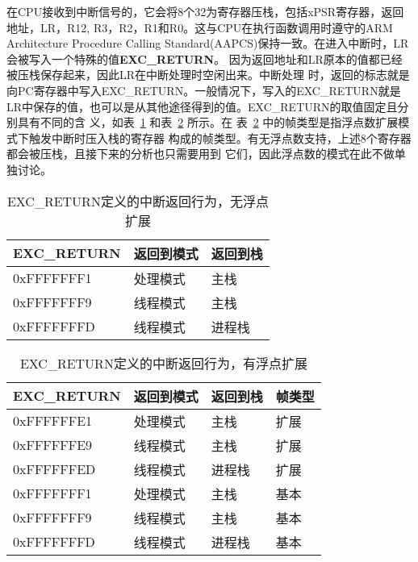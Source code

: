 在CPU接收到中断信号的，它会将8个32为寄存器压栈，包括xPSR寄存器，返回地址，LR，R12,
R3，R2，R1和R0。这与CPU在执行函数调用时遵守的ARM Architecture Procedure Calling
Standard(AAPCS)保持一致。在进入中断时，LR会被写入一个特殊的值\textbf{EXC\_RETURN}。
因为返回地址和LR原本的值都已经被压栈保存起来，因此LR在中断处理时空闲出来。中断处理
时，返回的标志就是向PC寄存器中写入EXC\_RETURN。一般情况下，写入的EXC\_RETURN就是
LR中保存的值，也可以是从其他途径得到的值。EXC\_RETURN的取值固定且分别具有不同的含
义，如表~\ref{tab:exe_return_noFP} 和表~\ref{tab:exe_return_FP} 所示。在
表~\ref{tab:exe_return_FP} 中的帧类型是指浮点数扩展模式下触发中断时压入栈的寄存器
构成的帧类型。有无浮点数支持，上述8个寄存器都会被压栈，且接下来的分析也只需要用到
它们，因此浮点数的模式在此不做单独讨论。\cite{ARM} 

\begin{table}[htb]
	\centering
	\caption{EXC\_RETURN定义的中断返回行为，无浮点扩展}
	\label{tab:exe_return_noFP}
	\begin{tabularx}{\linewidth}{XXX}
		\toprule[1.5pt]
		{\heiti EXC\_RETURN} & {\heiti 返回到模式} & {\heiti 返回到栈}\\
		\midrule[1pt]
		0xFFFFFFF1 & 处理模式 & 主栈 \\
		\midrule[0.5pt]
		0xFFFFFFF9 & 线程模式 & 主栈 \\
		\midrule[0.5pt]
		0xFFFFFFFD & 线程模式 & 进程栈 \\
		\bottomrule[1.5pt]
	\end{tabularx}
\end{table}

\begin{table}[htb]
	\centering
	\caption{EXC\_RETURN定义的中断返回行为，有浮点扩展}
	\label{tab:exe_return_FP}
	\begin{tabularx}{\linewidth}{XXXX}
		\toprule[1.5pt]
		{\heiti EXC\_RETURN} & {\heiti 返回到模式} & {\heiti 返回到栈} &
		{\heiti 帧类型}\\
		\midrule[1pt]
		0xFFFFFFE1 & 处理模式 & 主栈 & 扩展\\
		\midrule[0.5pt]
		0xFFFFFFE9 & 线程模式 & 主栈 & 扩展\\
		\midrule[0.5pt]
		0xFFFFFFED & 线程模式 & 进程栈 & 扩展\\
		\midrule[0.5pt]
		0xFFFFFFF1 & 处理模式 & 主栈 & 基本\\
		\midrule[0.5pt]
		0xFFFFFFF9 & 线程模式 & 主栈 & 基本\\
		\midrule[0.5pt]
		0xFFFFFFFD & 线程模式 & 进程栈 & 基本\\
		\bottomrule[1.5pt]
	\end{tabularx}
\end{table}

